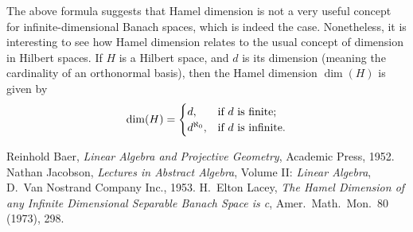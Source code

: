 \documentclass[12pt]{article}
\begin{document}
The above formula suggests that Hamel dimension 
is not a very useful concept for infinite-dimensional Banach spaces,
which is indeed the case.
Nonetheless, it is interesting to see how Hamel dimension relates to
the usual concept of dimension in Hilbert spaces.
If $H$ is a Hilbert space,
and $d$ is its dimension 
(meaning the cardinality of an orthonormal basis),
then the Hamel dimension $\dim(H)$ is given by
\[
  \dim(H)=\begin{cases}
             d,&\hbox{if }d\hbox{ is finite};\\
             d^{\aleph_0},&\hbox{if }d\hbox{ is infinite}.
          \end{cases}
\]

\begin{thebibliography}{9}
 Reinhold Baer,
 {\it Linear Algebra and Projective Geometry},
 Academic Press, 1952.
 Nathan Jacobson,
 {\it Lectures in Abstract Algebra},
 Volume II: {\it Linear Algebra},
 D.\ Van Nostrand Company Inc., 1953.
 H.\ Elton Lacey,
 {\it The Hamel Dimension of any Infinite Dimensional Separable Banach Space is c},
 Amer.\ Math.\ Mon.\ 80 (1973), 298.
\end{thebibliography}

\end{document}

